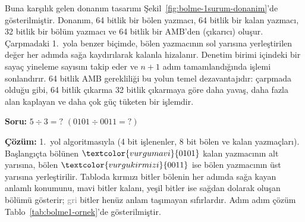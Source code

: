 Buna karşılık gelen donanım tasarımı Şekil~\ref{fig:bolme-1surum-donanim}'de gösterilmiştir. Donanım, 64 bitlik bir bölen yazmacı, 64 bitlik bir kalan yazmacı, 32 bitlik bir bölüm yazmacı ve 64 bitlik bir AMB'den (çıkarıcı) oluşur. Çarpmadaki 1.\ yola benzer biçimde, bölen yazmacının sol yarısına yerleştirilen değer her adımda sağa kaydırılarak kalanla hizalanır. Denetim birimi içindeki bir sayaç yineleme sayısını takip eder ve $n{+}1$ adım tamamlandığında işlemi sonlandırır. 64 bitlik AMB gerekliliği bu yolun temel dezavantajıdır: çarpmada olduğu gibi, 64 bitlik çıkarma 32 bitlik çıkarmaya göre daha yavaş, daha fazla alan kaplayan ve daha çok güç tüketen bir işlemdir.

\begin{ornek}[5.10]
\textbf{Soru:} $5 \div 3 = ?$ \quad $(0101 \div 0011 = ?)$

\textbf{Çözüm:} 1.\ yol algoritmasıyla (4 bit işlenenler, 8 bit bölen ve kalan yazmaçları). Başlangıçta bölünen $\textcolor{vurgumavi}{0101}$ kalan yazmacının alt yarısına, bölen $\textcolor{vurgukirmizi}{0011}$ ise bölen yazmacının üst yarısına yerleştirilir. Tabloda \textcolor{vurgukirmizi}{kırmızı} bitler bölenin her adımda sağa kayan anlamlı konumunu, \textcolor{vurgumavi}{mavi} bitler kalanı, \textcolor{vurguyesil}{yeşil} bitler ise sağdan dolarak oluşan bölümü gösterir; \textcolor{gray}{gri} bitler henüz anlam taşımayan sıfırlardır. Adım adım çözüm Tablo~\ref{tab:bolme1-ornek}'de gösterilmiştir.


\end{ornek}
